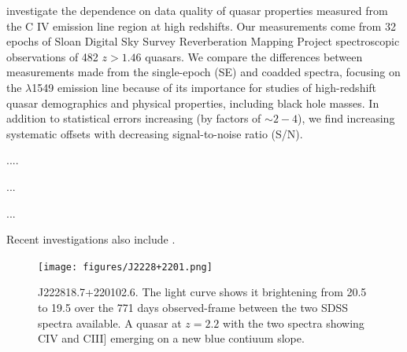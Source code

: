 \documentclass[a4paper,fleqn,usenatbib]{mnras}
\begin{document}



\citet{Denney2016}
investigate the dependence on data quality of quasar properties
measured from the C IV emission line region at high redshifts.  Our
measurements come from 32 epochs of Sloan Digital Sky Survey
Reverberation Mapping Project spectroscopic observations of 482 $z >
1.46$ quasars. We compare the differences between measurements made
from the single-epoch (SE) and coadded spectra, focusing on the \civ
$\lambda$1549 emission line because of its importance for studies of
high-redshift quasar demographics and physical properties, including
black hole masses. In addition to statistical errors increasing (by
factors of $\sim2-4$), we find increasing systematic offsets with
decreasing signal-to-noise ratio (S/N).

\citet{Grier2015}....

\citep{Corbin1991, Dimitrijevic1992, Wills1993, Brotherton1994, Osmer1994} ...

\citep{Nazarova2003} ...


Recent investigations also include \citet{Meyer2019}. 


\iffalse
\begin{figure}
  \centering
  \texttt{[image: figures/J2228+2201.png]}
  \vspace{-12pt}
  \caption[]{J222818.7+220102.6. 
The light curve shows it brightening from 20.5 to 19.5 over the 771 days observed-frame between the two SDSS spectra available. 
A quasar at $z = 2.2$ with the two spectra showing CIV and CIII] emerging on a new blue contiuum slope.}
  \label{fig:disk_suppression}
\end{figure}
\end{document}
